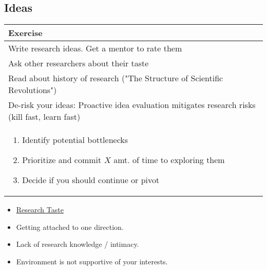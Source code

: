 \subsection{Ideas}
\begin{summary}
    \begin{center}
        \begin{tabular}{l}
            \toprule
            \textbf{Exercise} \\
            \toprule
            Write research ideas. Get a mentor to rate them \\
            \midrule
            Ask other researchers about their taste \\
            \midrule
            Read about history of research ("The Structure of Scientific Revolutions") \\
            \midrule
            De-risk your ideas: Proactive idea evaluation mitigates research risks (kill fast, learn fast) \\
            \multicolumn{1}{p{\linewidth}}{
            \begin{enumerate}
                \item Identify potential bottlenecks
                \item Prioritize and commit $X$ amt. of time to exploring them
                \item Decide if you should continue or pivot
            \end{enumerate}} \\
            \bottomrule
        \end{tabular}
    \end{center}
    \begin{itemize}
        \item \href{https://colah.github.io/notes/taste/}{Research Taste}
    \end{itemize}
\end{summary}

\begin{warning}
    \begin{itemize}
        \item Getting attached to one direction. 
        \item Lack of research knowledge / intimacy.
        \item Environment is not supportive of your interests.
    \end{itemize}
\end{warning}
\newpage

